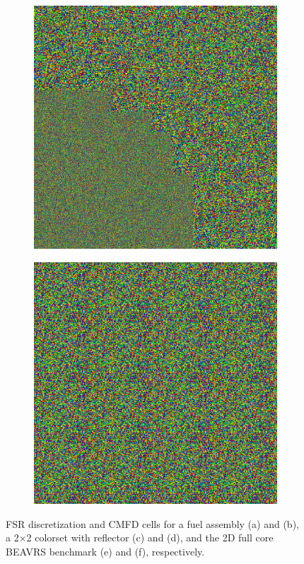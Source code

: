 \begin{figure}[h!]
\begin{subfigure}{0.5\textwidth}
  \centering
  \includegraphics[width=0.8\linewidth]{figures/quantification/fsrs/fsrs-full-core-quarter-pin-cmfd}
  \caption{}
  \label{fig:chap8-full-core-fsrs}
\end{subfigure}%
\begin{subfigure}{0.5\textwidth}
  \centering
  \includegraphics[width=0.8\linewidth]{figures/quantification/cmfd/cmfd-cells-full-core}
  \caption{}
  \label{fig:chap8-full-core-cmfd-cells}
\end{subfigure}
\caption[FSR discretization and CMFD cells for heterogeneous benchmarks]{\ac{FSR} discretization and \ac{CMFD} cells for a fuel assembly (a) and (b), a 2$\times$2 colorset with reflector (c) and (d), and the 2D full core \ac{BEAVRS} benchmark (e) and (f), respectively.}
\label{fig:chap8-assm-fsrs-cmfd-cells}
\end{figure}



